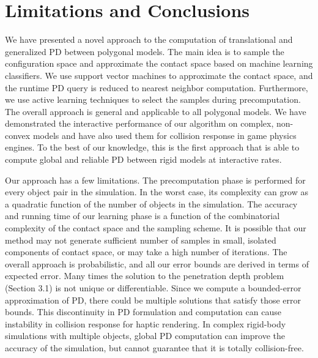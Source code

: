 \section{Limitations and Conclusions}
We have presented a novel approach to the computation of translational and generalized PD between polygonal models.
The main idea is to sample the configuration space and approximate the contact space based on
machine learning classifiers. We use support vector machines to approximate the contact space, and
the runtime PD query is reduced to nearest neighbor computation. Furthermore,
we use active learning techniques to select the samples during precomputation.
The overall approach is general and applicable to all polygonal models.
We have demonstrated the interactive performance of our algorithm on complex, non-convex models and  have also used
them for collision response in game physics engines.
To the best of our knowledge, this is the first approach that is able to compute global and reliable PD between rigid models at
interactive rates.


Our approach has a few limitations. The precomputation phase is performed for every object pair in the simulation.
In the worst case, its complexity can grow as a quadratic function of the number of objects in the simulation.
The accuracy and running time of  our learning phase is a function of the combinatorial complexity of the contact
space and the sampling scheme. It is possible that our method may not generate sufficient number of samples in small,
isolated components of contact space, or may take a high number of iterations.
The overall approach is probabilistic, and all our error bounds are derived in terms of expected error.
Many times the solution to the penetration depth  problem (Section 3.1) is not unique or differentiable. Since we compute
a bounded-error approximation of PD, there could be multiple solutions that satisfy those error bounds.
This discontinuity in PD formulation and computation can cause instability in collision response for haptic rendering. In complex rigid-body simulations with multiple objects, global PD  computation can improve the accuracy of the simulation, but cannot guarantee that it is totally collision-free.


